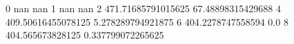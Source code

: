 0 nan nan
1 nan nan
2 471.71685791015625 67.48898315429688
4 409.50616455078125 5.278289794921875
6 404.2278747558594 0.0
8 404.565673828125 0.337799072265625
